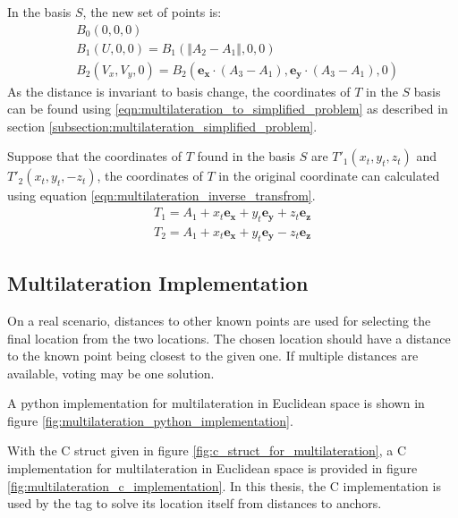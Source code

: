\documentclass[\main/main.tex]{subfiles}
\begin{document}
In the basis $S$, the new set of points is:
\begin{equation}
    \begin{split}
        &B_0(0,0,0) \\
        &B_1(U, 0, 0) = B_1(\Vert A_2 - A_1 \Vert, 0, 0) \\
        &B_2(V_x, V_y, 0) = B_2(\boldsymbol{e_x} \cdot (A_3 - A_1), \boldsymbol{e_y} \cdot (A_3 - A_1), 0) 
    \end{split}
    \label{eqn:multilateration_to_simplified_problem}
\end{equation}
As the distance is invariant to basis change, the coordinates of $T$ in the $S$ basis can be found using \ref{eqn:multilateration_to_simplified_problem} as described in section \ref{subsection:multilateration_simplified_problem}.

Suppose that the coordinates of $T$ found in the basis $S$ are $T'_1(x_t,y_t,z_t)$ and $T'_2(x_t, y_t, -z_t)$, the coordinates of $T$ in the original coordinate can calculated using equation \ref{eqn:multilateration_inverse_transfrom}.
\begin{equation}
    \begin{split}
        T_1 = A_1 + x_t\boldsymbol{e_x} + y_t\boldsymbol{e_y} + z_t\boldsymbol{e_z} \\
        T_2 = A_1 + x_t\boldsymbol{e_x} + y_t\boldsymbol{e_y} - z_t\boldsymbol{e_z} 
    \end{split}
    \label{eqn:multilateration_inverse_transfrom}
\end{equation}

\subsection{Multilateration Implementation}

On a real scenario, distances to other known points are used for selecting the final location from the two locations. The chosen location should have a distance to the known point being closest to the given one. If multiple distances are available, voting may be one solution.

A python implementation for multilateration in Euclidean space is shown in figure \ref{fig:multilateration_python_implementation}.

With the C struct given in figure \ref{fig:c_struct_for_multilateration}, a C implementation for multilateration in Euclidean space is provided in figure \ref{fig:multilateration_c_implementation}. In this thesis, the C implementation is used by the tag to solve its location itself from distances to anchors.
\end{document}
